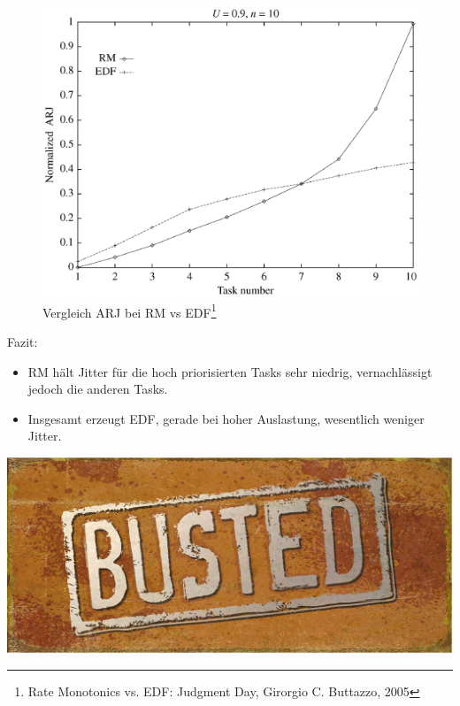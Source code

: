 \begin{frame}{\subsecname}
	\begin{center}
	\begin{figure}
		\includegraphics[scale=.20]{graphics/vergleich/jitter.png}
		\caption{Vergleich ARJ bei RM vs EDF\footnote{Rate Monotonics vs. EDF: Judgment Day, Girorgio C. Buttazzo, 2005}}	
	\end{figure}
	\end{center}
\end{frame}

\begin{frame}{\subsecname}
	Fazit:
	\begin{itemize}
		\item RM hält Jitter für die hoch priorisierten Tasks sehr niedrig, vernachlässigt jedoch die anderen Tasks.
		\item Insgesamt erzeugt EDF, gerade bei hoher Auslastung, wesentlich weniger Jitter.
	\end{itemize}
\end{frame}

\begin{frame}{\subsecname}
	\begin{center}
			\includegraphics[scale=1]{graphics/memes/busted.jpg}
	\end{center}
\end{frame}

%